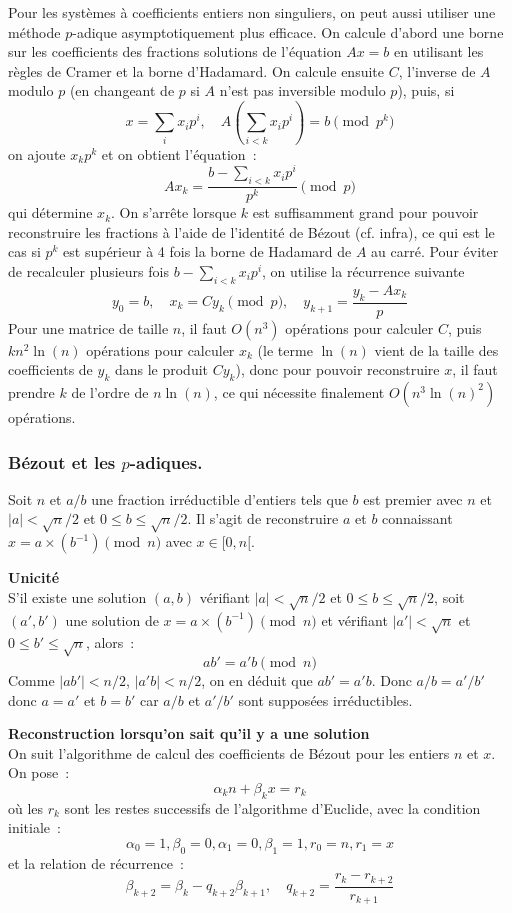 \documentclass[a4paper,11pt]{article}
\begin{document}
Pour les syst\`emes \`a coefficients entiers non singuliers, 
on peut aussi utiliser une m\'ethode $p$-adique asymptotiquement
plus efficace. On calcule d'abord une borne sur les
coefficients des fractions solutions de l'\'equation $Ax=b$
en utilisant les règles de Cramer et la borne d'Hadamard.
On calcule ensuite $C$, l'inverse de $A$ modulo $p$ (en changeant de $p$ si
$A$ n'est pas inversible modulo $p$), puis, si
\[ x=\sum_i x_i p^i, \quad A(\sum_{i<k} x_i p^i)=b \pmod{p^k} \]
on ajoute $x_k p^k $ et on obtient l'\'equation~:
\[ Ax_k = \frac{b-\sum_{i <k}  x_i p^i}{p^k} \pmod p \]
qui d\'etermine $x_k$.
On s'arr\^ete lorsque $k$ est suffisamment grand pour pouvoir reconstruire
les fractions \`a l'aide de l'identité de B\'ezout (cf. infra),
ce qui est le cas si $p^k$ est
sup\'erieur \`a 4 fois la borne de Hadamard de $A$ au carr\'e.
Pour \'eviter de recalculer plusieurs fois $b-\sum_{i <k}  x_i p^i$,
on utilise la r\'ecurrence suivante
\[ y_0=b, \quad x_{k}=Cy_k \pmod p, \quad y_{k+1} =
\frac{y_k-Ax_{k}}{p}\]
Pour une matrice de taille $n$, il faut $O(n^3)$ op\'erations
pour calculer $C$, puis $kn^2 \ln(n)$ op\'erations 
pour calculer $x_k$ (le terme $\ln(n)$ 
vient de la taille des coefficients
de $y_k$ dans le produit $Cy_k$),
donc pour pouvoir reconstruire $x$, il faut prendre $k$ de l'ordre
de $n\ln(n)$, ce qui n\'ecessite finalement $O(n^3\ln(n)^2)$ op\'erations.

\subsubsection{B\'ezout et les $p$-adiques.}
Soit $n$ et $a/b$ une fraction irr\'eductible d'entiers tels que 
$b$ est premier avec $n$ et $|a| < \sqrt{n}/2$ et $ 0 \leq b \leq \sqrt{n}/2$.
Il s'agit de reconstruire $a$ et $b$ connaissant 
$x=a \times (b^{-1}) \pmod n$ avec $x\in [0,n[$.

{\bf Unicit\'e}\\
S'il existe une solution $(a,b)$ vérifiant $|a| < \sqrt{n}/2$ et 
$ 0 \leq b \leq \sqrt{n}/2$, soit $(a',b')$ une solution
de $x=a \times (b^{-1}) \pmod n$ et 
vérifiant $|a'| < \sqrt{n}$ et $ 0 \leq b' \leq \sqrt{n}$, alors~:
\[ a b'=a' b \pmod n \]
Comme $|ab'| < n/2$, $|a'b| <n/2$, 
on en d\'eduit que $ab'=a'b$. Donc $a/b=a'/b'$
donc $a=a'$ et $b=b'$ car $a/b$ et $a'/b'$ sont suppos\'ees irr\'eductibles.

{\bf Reconstruction lorsqu'on sait qu'il y a une solution}\\
On suit l'algorithme de calcul des coefficients de B\'ezout
pour les entiers $n$ et $x$. On pose~:
\[ \alpha_k n + \beta_k x= r_k \]
o\`u les $r_k$ sont les restes successifs de l'algorithme d'Euclide,
avec la condition initiale~:
\[ \alpha_0=1, \beta_0=0, \alpha_1=0, \beta_1=1, r_0=n, r_1=x \]
et la relation de r\'ecurrence~:
\[ \beta_{k+2}=\beta_k - q_{k+2} \beta_{k+1}, \quad
q_{k+2}=\frac{r_{k}-r_{k+2}}{r_{k+1}}\]
\end{document}
